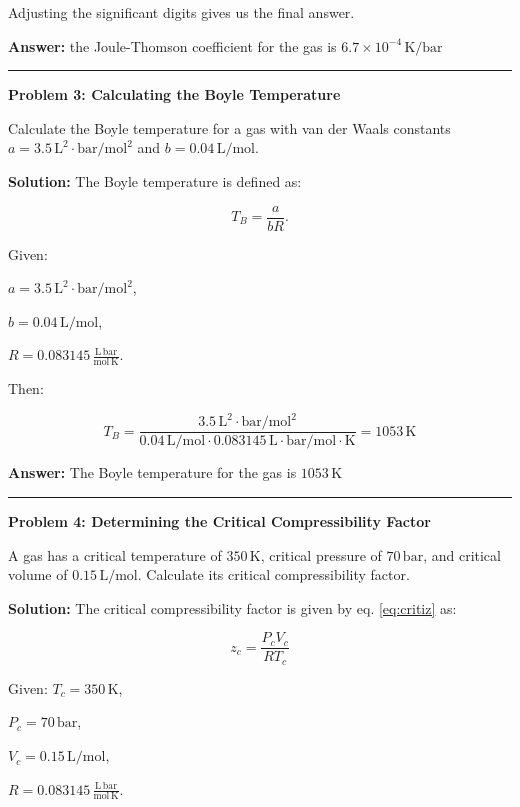 \documentclass[
  9pt,
]{extbook}
\theoremstyle{definition}
\theoremstyle{definition}
\theoremstyle{definition}
\theoremstyle{definition}
\theoremstyle{remark}
\begin{document}
Adjusting the significant digits gives us the final answer.

\textbf{Answer:} the Joule-Thomson coefficient for the gas is \(6.7 \times 10^{-4}\,\text{K}/\text{bar}\)

\begin{center}\rule{0.5\linewidth}{0.5pt}\end{center}

\textbf{Problem 3: Calculating the Boyle Temperature}

Calculate the Boyle temperature for a gas with van der Waals constants \(a = 3.5\,\text{L}^2\cdot\text{bar}/\text{mol}^2\) and \(b = 0.04\,\text{L}/\text{mol}\).

\textbf{Solution:} The Boyle temperature is defined as:

\[T_B = \frac{a}{bR}.\]

Given:

\(a = 3.5\,\text{L}^2\cdot\text{bar}/\text{mol}^2\),

\(b = 0.04\,\text{L}/\text{mol}\),

\(R = 0.083145\,\frac{\text{L}\,\text{bar}}{\text{mol}\,\text{K}}\).

Then:

\[T_B = \frac{3.5\,\text{L}^2\cdot\text{bar}/\text{mol}^2}{0.04\,\text{L}/\text{mol} \cdot 0.083145\,\text{L}\cdot\text{bar}/\text{mol}\cdot\text{K}}=1053\,\text{K}\]

\textbf{Answer:} The Boyle temperature for the gas is
\(1053\,\text{K}\)

\begin{center}\rule{0.5\linewidth}{0.5pt}\end{center}

\textbf{Problem 4: Determining the Critical Compressibility Factor}

A gas has a critical temperature of \(350\,\text{K}\), critical pressure of \(70\,\text{bar}\), and critical volume of \(0.15\,\text{L}/\text{mol}\). Calculate its critical compressibility factor.

\textbf{Solution:} The critical compressibility factor is given by eq. \eqref{eq:critiz} as:

\[z_c = \frac{P_cV_c}{RT_c}\]

Given:
\(T_c = 350\,\text{K}\),

\(P_c = 70\,\text{bar}\),

\(V_c = 0.15\,\text{L}/\text{mol}\),

\(R = 0.083145\,\frac{\text{L}\,\text{bar}}{\text{mol}\,\text{K}}\).
\end{document}
